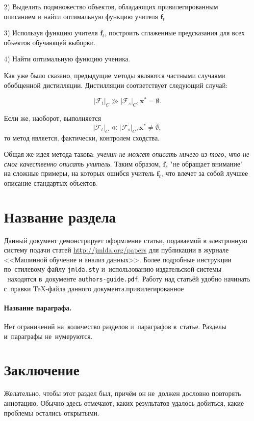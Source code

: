 \documentclass[12pt,twoside]{article}
\begin{document}
2) Выделить подмножество объектов, обладающих привилегированным описанием и найти оптимальную функцию учителя $\mathbf{f}_t$

3) Используя функцию учителя $\mathbf{f}_t$, построить сглаженные предсказания для всех объектов обучающей выборки.

4) Найти оптимальную функцию ученика.

Как уже было сказано, предыдущие методы являются частными случаями обобщенной дистилляции. Дистилляции соответствует следующий случай:

$$ |\mathcal{F}_t|_C \gg |\mathcal{F}_s|_C, \mathbf{x}^* = \emptyset . $$

Если же, наоборот, выполняется
$$|\mathcal{F}_t|_C \ll |\mathcal{F}_s|_C, \mathbf{x}^* \neq \emptyset , $$
то метод является, фактически, контролем сходства.

Общая же идея метода такова: \emph{ученик не может описать ничего из того, что не смог качественно описать учитель}.
Таким образом, $\mathbf{f}_s$ "не обращает внимание" на сложные примеры, на которых ошибся учитель $\mathbf{f}_t$,  что влечет за собой лучшее описание стандартых объектов.


\section{Название раздела}
Данный документ демонстрирует оформление статьи,
подаваемой в электронную систему подачи статей \url{http://jmlda.org/papers} для публикации в журнале <<Машинной обучение и анализ данных>>.
Более подробные инструкции по~стилевому файлу \texttt{jmlda.sty}
и~использованию издательской системы \LaTeXe\
находятся в~документе \texttt{authors-guide.pdf}.
Работу над статьёй удобно начинать с~правки \TeX-файла данного документа.привилегированное 

\paragraph{Название параграфа.}
Нет ограничений на~количество разделов и~параграфов в~статье.
Разделы и~параграфы не~нумеруются.




\section{Заключение}
Желательно, чтобы этот раздел был, причём он не~должен дословно повторять аннотацию.
Обычно здесь отмечают,
каких результатов удалось добиться,
какие проблемы остались открытыми.



{}


\end{document}

